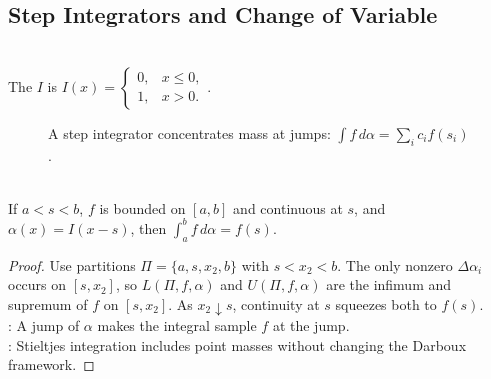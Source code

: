 \subsection{Step Integrators and Change of Variable}

\begin{definition} \label{def:unit-step-function-analysis} \\
The  $I$ is $I(x)=
\begin{cases}
0,&x\leq0,\\
1,&x>0.
\end{cases}$.
\end{definition}

\begin{figure}[H]
  \centering
  
  \caption{A step integrator concentrates mass at jumps: $\int f\,d\alpha=\sum_i c_i f(s_i)$.}
  \label{fig:riemann-stieltjes-step-integrator}
\end{figure}

\begin{theorem} \label{thm:single-step-riemann-stieltjes-integral} \\
If $a<s<b$, $f$ is bounded on $[a,b]$ and continuous at $s$, and $\alpha(x)=I(x-s)$, then $\int_a^b f\,d\alpha=f(s)$.
\begin{proof}
Use partitions $\Pi=\{a,s,x_2,b\}$ with $s<x_2<b$. The only nonzero $\Delta\alpha_i$ occurs on $[s,x_2]$, so $L(\Pi,f,\alpha)$ and $U(\Pi,f,\alpha)$ are the infimum and supremum of $f$ on $[s,x_2]$. As $x_2\downarrow s$, continuity at $s$ squeezes both to $f(s)$.\\
: A jump of $\alpha$ makes the integral sample $f$ at the jump.\\
: Stieltjes integration includes point masses without changing the Darboux framework.
\end{proof}
\end{theorem}


